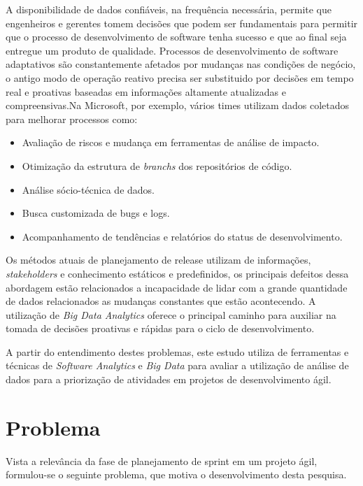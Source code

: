 A disponibilidade de dados confiáveis, na frequência necessária, permite que 
engenheiros e gerentes tomem decisões que podem ser fundamentais para permitir 
que o processo de desenvolvimento de software tenha sucesso e que ao final seja 
entregue um produto de qualidade\cite{codemine}. Processos de desenvolvimento
de software adaptativos são constantemente afetados por mudanças nas condições
de negócio, o antigo modo de operação reativo precisa ser substituido por decisões
em tempo real e proativas baseadas em informações altamente atualizadas e
compreensivas\cite{artAndScience}.Na Microsoft, por exemplo, vários times utilizam
dados coletados para melhorar processos como:

\begin{itemize}
    \item Avaliação de riscos e mudança em ferramentas de análise de impacto.
    \item Otimização da estrutura de \textit{branchs} dos repositórios de código.
    \item Análise sócio-técnica de dados.
    \item Busca customizada de bugs e logs.
    \item Acompanhamento de tendências e relatórios do status de desenvolvimento.
\end{itemize}

Os métodos atuais de planejamento de release utilizam de informações, \textit{stakeholders}
e conhecimento estáticos e predefinidos, os principais defeitos dessa abordagem 
estão relacionados a incapacidade de lidar com a grande quantidade de dados
relacionados as mudanças constantes que estão acontecendo. A utilização de 
\textit{Big Data Analytics} oferece o principal caminho para auxiliar na tomada 
de decisões proativas e rápidas para o ciclo de desenvolvimento\cite{artAndScience}.

A partir do entendimento destes problemas, este estudo utiliza de ferramentas
e técnicas de \textit{Software Analytics} e \textit{Big Data} para avaliar a
utilização de análise de dados para a priorização de atividades em projetos de
desenvolvimento ágil. 

\section{Problema}

Vista a relevância da fase de planejamento de sprint em um projeto ágil, 
formulou-se o seguinte problema, que motiva o desenvolvimento desta pesquisa.

